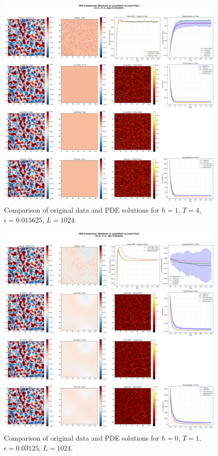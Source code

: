 \documentclass[11pt,a4paper]{article}
\begin{document}
\begin{figure}[!h]
    \centering
    \includegraphics[width=1.0\textwidth]{fig/compare_pde_solvers_L1024_h1_T4_eps0.015625.png}
    \caption{Comparison of original data and PDE solutions for $h=1$, $T=4$, $\epsilon=0.015625$, $L=1024$.}
    \label{fig:pde_comparison_h1_T4_eps0.015625}
\end{figure}


\begin{figure}[!h]
    \centering
    \includegraphics[width=1.0\textwidth]{fig/compare_pde_solvers_L1024_h0_T1_eps0.03125.png}
    \caption{Comparison of original data and PDE solutions for $h=0$, $T=1$, $\epsilon=0.03125$, $L=1024$.}
    \label{fig:pde_comparison_h0_T1_eps0.03125}
\end{figure}
\end{document}
